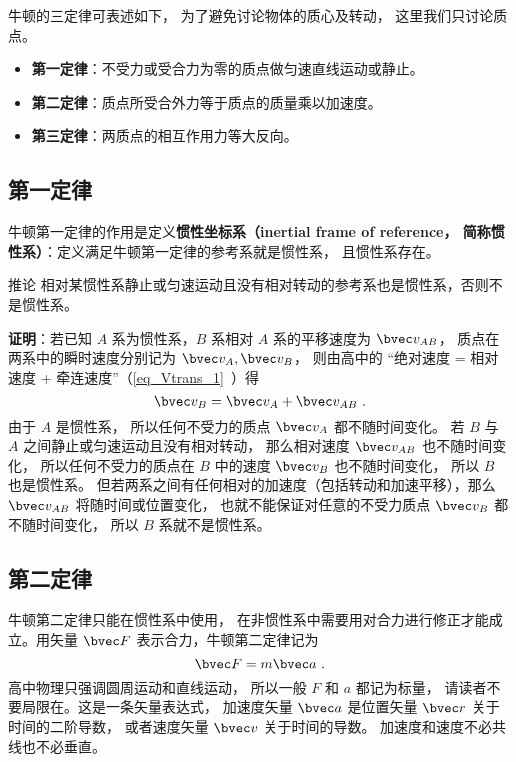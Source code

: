 

牛顿的三定律可表述如下， 为了避免讨论物体的质心及转动， 这里我们只讨论质点。
\begin{itemize}
\item \textbf{第一定律}：不受力或受合力为零的质点做匀速直线运动或静止。
\item \textbf{第二定律}：质点所受合外力等于质点的质量乘以加速度。
\item \textbf{第三定律}：两质点的相互作用力等大反向。
\end{itemize}

\subsection{第一定律}

牛顿第一定律的作用是定义\textbf{惯性坐标系（inertial frame of reference， 简称惯性系）}：定义满足牛顿第一定律的参考系就是惯性系， 且惯性系存在。

\begin{corollary}{推论}
相对某惯性系静止或匀速运动且没有相对转动的参考系也是惯性系，否则不是惯性系。
\end{corollary}
\textbf{证明}：若已知 $A$ 系为惯性系，$B$ 系相对 $A$ 系的平移速度为 $\bvec v_{AB}$， 质点在两系中的瞬时速度分别记为 $\bvec v_A, \bvec v_B$， 则由高中的 “绝对速度 = 相对速度 + 牵连速度”（\autoref{eq_Vtrans_1}~）得
\begin{equation}
\bvec v_{B} = \bvec v_{A} + \bvec v_{AB}~.
\end{equation}
由于 $A$ 是惯性系， 所以任何不受力的质点 $\bvec v_{A}$ 都不随时间变化。 若 $B$ 与 $A$ 之间静止或匀速运动且没有相对转动， 那么相对速度 $\bvec v_{AB}$ 也不随时间变化， 所以任何不受力的质点在 $B$ 中的速度 $\bvec v_{B}$ 也不随时间变化， 所以 $B$ 也是惯性系。 但若两系之间有任何相对的加速度（包括转动和加速平移），那么 $\bvec v_{AB}$ 将随时间或位置变化， 也就不能保证对任意的不受力质点 $\bvec v_B$ 都不随时间变化， 所以 $B$ 系就不是惯性系。

\subsection{第二定律}

牛顿第二定律只能在惯性系中使用， 在非惯性系中需要用对合力进行修正才能成立。用矢量 $\bvec F$ 表示合力，牛顿第二定律记为
\begin{equation}\label{eq_New3_1}
\bvec F = m\bvec a~.
\end{equation}
高中物理只强调圆周运动和直线运动， 所以一般 $F$ 和 $a$ 都记为标量， 请读者不要局限在。这是一条矢量表达式， 加速度矢量 $\bvec a$ 是位置矢量 $\bvec r$ 关于时间的二阶导数， 或者速度矢量 $\bvec v$ 关于时间的导数。 加速度和速度不必共线也不必垂直。

